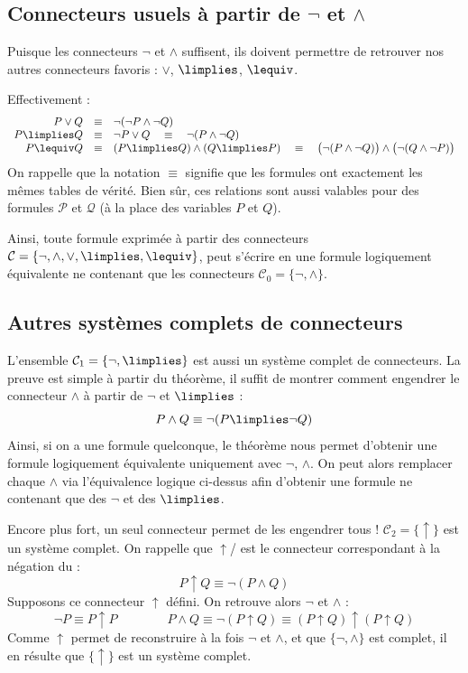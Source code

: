 \documentclass[11pt,class=report,crop=false]{standalone}
\begin{document}
\subsection{Connecteurs usuels à partir de $\lnot$ et $\land$}

Puisque les connecteurs $\lnot$ et $\land$ suffisent, ils doivent permettre de retrouver nos autres connecteurs favoris : $\lor$, $\limplies$, $\lequiv$.

Effectivement :
\[
\begin{array}{rcl}
	P \lor Q &\equiv& \lnot(\lnot P \land \lnot Q) \\
	P \limplies Q &\equiv& \lnot P \lor Q \quad \equiv \quad \lnot (P \land \lnot Q) \\
	P \lequiv Q &\equiv& (P \limplies Q) \land (Q \limplies P) \quad \equiv \quad
	\big(\lnot (P \land \lnot Q)\big) \land \big(\lnot (Q \land \lnot P)\big)
\end{array}
\]
On rappelle que la notation $\equiv$ signifie que les formules ont exactement les mêmes tables de vérité.
Bien sûr, ces relations sont aussi valables pour des formules $\mathcal{P}$ et $\mathcal{Q}$ (à la place des variables $P$ et $Q$).

Ainsi, toute formule exprimée à partir des connecteurs $\mathcal{C} = \{\lnot, \land, \lor, \limplies, \lequiv\}$, peut s'écrire en une formule logiquement équivalente ne contenant que les connecteurs $\mathcal{C}_0 = \{\lnot, \land\}$.



\subsection{Autres systèmes complets de connecteurs}

L'ensemble $\mathcal{C}_1 = \{ \lnot, \limplies \}$ est aussi un système complet de connecteurs. La preuve est simple à partir du théorème, il suffit de montrer comment engendrer le connecteur $\land$ à partir de $\lnot$ et $\limplies$ :
\[
P \land Q \equiv \lnot (P \limplies \lnot Q)
\]
Ainsi, si on a une formule quelconque, le théorème nous permet d'obtenir une formule logiquement équivalente uniquement avec $\lnot$, $\land$. On peut alors remplacer chaque $\land$ via l'équivalence logique ci-dessus afin d'obtenir une formule ne contenant que des $\lnot$ et des $\limplies$.

\bigskip

Encore plus fort, un seul connecteur permet de les engendrer tous !
$\mathcal{C}_2 = \{ \uparrow\}$ est un système complet. On rappelle que
$\uparrow$/ est le connecteur correspondant à la négation du \tand{} :
\[
P \uparrow Q \equiv  \lnot(P \land Q)
\]
Supposons ce connecteur $\uparrow$ défini. On retrouve alors $\lnot$ et $\land$ :
\[
\lnot P \equiv P \uparrow P
\qquad
\qquad
P \land Q \equiv \lnot(P \uparrow Q) \equiv (P \uparrow Q) \uparrow (P \uparrow Q)
\]
Comme $\uparrow$ permet de reconstruire à la fois $\lnot$ et $\land$, et que $\{ \lnot, \land \}$ est complet, il en résulte que $\{ \uparrow\}$ est un système complet.
\end{document}
